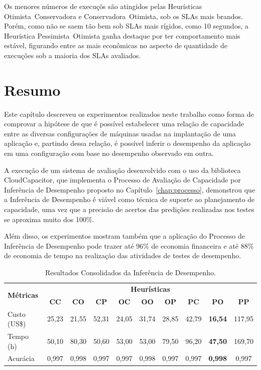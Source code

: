 Os menores números de execuçõs são atingidos pelas Heurísticas Otimista~Conservadora 
e Conservadora~Otimista, sob os SLAs mais brandos. Porém, como não se saem tão 
bem sob SLAs mais rígidos, como 10 segundos, a Heurística Pessimista~Otimista
ganha destaque por ter comportamento mais estável, figurando entre as mais 
econômicas no aspecto de quantidade de execuções sob a maioria dos SLAs avaliados.
 
\section{Resumo}
Este capítulo descreveu os experimentos realizados neste trabalho como forma de
comprovar a hipótese de que é possível estabelecer uma relação de capacidade
entre as diversas configurações de máquinas usadas na implantação de uma aplicação
e, partindo dessa relação, é possível inferir o desempenho da aplicação em uma
configuração com base no desempenho observado em outra.

A execução de um sistema de avaliação desenvolvido com o uso da biblioteca 
CloudCapacitor, que implementa o Processo de Avaliação de Capacidade
por Inferência de Desempenho proposto no Capítulo~\ref{chap:processo}, demonstrou
que a Inferência de Desempenho é viável como técnica de suporte ao 
planejamento de capacidade, uma vez que a precisão de acertos das predições 
realizadas nos testes se aproxima muito dos 100\%.

Além disso, os experimentos mostram também que a aplicação do Processo de Inferência 
de Desempenho pode trazer até 96\% de economia financeira e até 88\% de economia 
de tempo na realização das atividades de testes de desempenho.

\begin{table}[htbp]
  \centering
    \begin{tabular}{|l|c|c|c|c|c|c|c|c|c|}
    \hline
    \multirow{2}{*}{\textbf{Métricas}} & \multicolumn{9}{c|}{\textbf{Heurísticas}} \\
    \cline{2-10}
                 & \textbf{CC}    & \textbf{CO}    & \textbf{CP}    & \textbf{OC}    & \textbf{OO}    & \textbf{OP}    & \textbf{PC}    & \textbf{PO}    & \textbf{PP} \\
    \hline
    Custo (US\$) & 25,23 & 21,55 & 52,31 & 24,05 & 31,74 & 28,85 & 42,79 & \cellcolor{OliveGreen}\textbf{\color{yellow}16,54} & 117,95 \\
    Tempo (h)    & 50,10 & 80,30 & 50,60 & 53,00 & 53,00 & 79,50 & 96,20 & \cellcolor{OliveGreen}\textbf{\color{yellow}47,50} & 169,70 \\
    Acurácia     & 0,997 & 0,998 & 0,997 & 0,997 & 0,998 & 0,997 & 0,997 & \cellcolor{OliveGreen}\textbf{\color{yellow}0,998} & 0,997  \\
    \hline
    \end{tabular}%
  \caption{\label{table:resultado_consolidado}Resultados Consolidados da Inferência de Desempenho.}
  \label{tab:addlabel}%
\end{table}%

